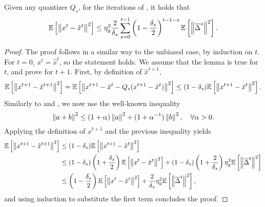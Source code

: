 \begin{lemma}  \label{lemma:hidden-state-biased}
    Given any quantizer $Q_s$, for the iterations of \algname{}, it holds that
    \begin{equation}
        \mathbb{E}\left[\left\lVert x^{t} - \hat x^{t}\right\rVert^2\right] \leq \eta_g^2 \frac{2}{\delta_s} \sum_{s=0}^{t-1} \left(1- \frac{\delta_s}{2 } \right)^{t-1-s} \mathbb{E}\left[ \left\lVert\overline{\Delta}^s\right\rVert^2\right].
    \end{equation}
\end{lemma}
\begin{proof}
    The proof follows in a similar way to the unbiased case, by induction on $t$.
    For $t=0$, $x^t = \hat x^t$, so the statement holds.
    We assume that the lemma is true for $t$, and prove for $t+1$.
    First, by definition of $\hat x^{t+1}$,
    \begin{equation}
        \mathbb{E}\left[\left\lVert x^{t+1} - \hat x^{t+1}\right\rVert^2\right] = \mathbb{E}\left[\left\lVert x^{t+1} - \hat x^{t} - Q_s(x^{t+1} - \hat x^t)\right\rVert^2\right] \leq (1-\delta_s) \mathbb{E}\left[\left\lVert x^{t+1} - \hat x^t\right\rVert^2\right].
    \end{equation}
    Similarly to \cite{choco_sgd} and \cite{EF21-P-and-friends}, we now use the well-known inequality
    \begin{equation}
        \left\lVert a + b\right\rVert^2 \leq (1 + \alpha) \left\lVert a\right\rVert^2 + (1 + \alpha^{-1}) \left\lVert b\right\rVert^2, \quad \forall \alpha > 0.
    \end{equation}
    Applying the definition of $x^{t+1}$ and the previous inequality yields
    \begin{equation}
        \begin{aligned}
            \mathbb{E}\left[\left\lVert x^{t+1} - \hat x^{t+1}\right\rVert^2\right] & \leq (1-\delta_s) \mathbb{E}\left[\left\lVert x^{t+1} - \hat x^t\right\rVert^2\right]                                                                                                                                        \\
                                                    & \leq (1-\delta_s) \left( 1+\frac{\delta_s}{2} \right) \mathbb{E}\left[\left\lVert x^{t} - \hat x^{t}\right\rVert^2\right] + (1-\delta_s) \left( 1 + \frac{2}{\delta_s} \right) \eta_g^2 \mathbb{E}\left[\left\lVert\overline{\Delta}^t\right\rVert^2\right] \\
                                                    & \leq \left( 1-\frac{\delta_s}{2} \right) \mathbb{E}\left[\left\lVert x^{t} - \hat x^{t}\right\rVert^2\right] + \frac{2}{\delta_s} \eta_g^2 \mathbb{E}\left[\left\lVert\overline{\Delta}^t\right\rVert^2\right],
        \end{aligned}
    \end{equation}
    and using induction to substitute the first term concludes the proof.
\end{proof}

